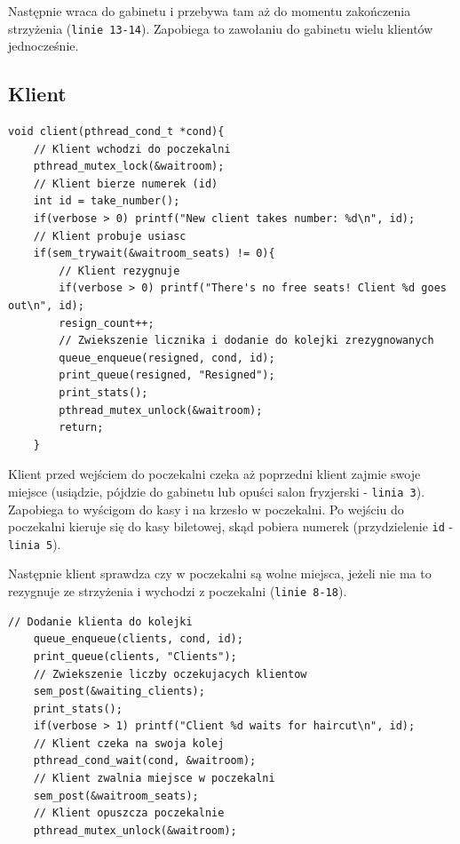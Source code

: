 \documentclass[12pt,a4paper]{article}
\begin{document}
	Następnie wraca do gabinetu i przebywa tam aż
	do momentu zakończenia strzyżenia (\texttt{linie 13-14}). Zapobiega
	to zawołaniu do gabinetu wielu klientów jednocześnie.
	
	\subsection{Klient}
	
	\begin{center}
		\begin{minipage}{0.82\linewidth}
\begin{lstlisting}[caption = Funkcja klienta 1/3.]
void client(pthread_cond_t *cond){
    // Klient wchodzi do poczekalni
    pthread_mutex_lock(&waitroom);
    // Klient bierze numerek (id)
    int id = take_number();
    if(verbose > 0) printf("New client takes number: %d\n", id);
    // Klient probuje usiasc
    if(sem_trywait(&waitroom_seats) != 0){
        // Klient rezygnuje
        if(verbose > 0) printf("There's no free seats! Client %d goes out\n", id);
        resign_count++;
        // Zwiekszenie licznika i dodanie do kolejki zrezygnowanych
        queue_enqueue(resigned, cond, id);
        print_queue(resigned, "Resigned");
        print_stats();
        pthread_mutex_unlock(&waitroom);
        return;
    }
\end{lstlisting}
		\end{minipage}
	\end{center}
	
	Klient przed wejściem do poczekalni czeka aż poprzedni klient
	zajmie swoje miejsce (usiądzie, pójdzie do gabinetu lub opuści salon
	fryzjerski - \texttt{linia 3}). Zapobiega to wyścigom do kasy i na
	krzesło w poczekalni. Po wejściu do poczekalni kieruje się do kasy 
	biletowej, skąd pobiera numerek (przydzielenie \texttt{id} -
	\texttt{linia 5}).
	
	Następnie klient sprawdza czy w poczekalni są wolne miejsca, jeżeli
	nie ma to rezygnuje ze strzyżenia i wychodzi z poczekalni
	(\texttt{linie 8-18}).
	
	\begin{center}
		\begin{minipage}{0.8\linewidth}
\begin{lstlisting}[caption = Funkcja klienta 2/3.]
// Dodanie klienta do kolejki
    queue_enqueue(clients, cond, id);
    print_queue(clients, "Clients");
    // Zwiekszenie liczby oczekujacych klientow
    sem_post(&waiting_clients);
    print_stats();
    if(verbose > 1) printf("Client %d waits for haircut\n", id);
    // Klient czeka na swoja kolej
    pthread_cond_wait(cond, &waitroom);
    // Klient zwalnia miejsce w poczekalni
    sem_post(&waitroom_seats);
    // Klient opuszcza poczekalnie
    pthread_mutex_unlock(&waitroom);
\end{lstlisting}
		\end{minipage}
	\end{center}
	
\end{document}
